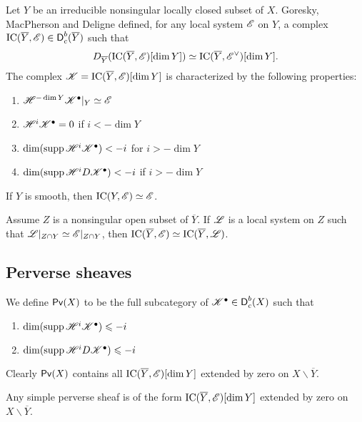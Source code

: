 \documentclass{article}
\begin{document}
Let $Y$ be an irreducible nonsingular locally closed subset of $X$. Goresky, 
MacPherson and Deligne defined, for any local system $\mathscr{E}$ on $Y$, a complex 
$\operatorname{IC}(\overline Y,\mathscr{E})\in \operatorname{\mathsf{D}}_c^b(\overline Y)$ such 
that 
\[
  D_{\overline Y}(\operatorname{IC}(\overline Y,\mathscr{E})[\dim Y]) \simeq \operatorname{IC}(\overline Y,\mathscr{E}^\vee)[\dim Y] .
\]
The complex $\mathscr{K}=\operatorname{IC}(\overline Y,\mathscr{E})[\dim Y]$ is 
characterized by the following properties:
\begin{enumerate}
  \item $\mathscr{H}^{-\dim Y} \mathscr{K}^\bullet|_Y \simeq \mathscr{E}$
  \item $\mathscr{H}^i\mathscr{K}^\bullet=0$ if $i<-\dim Y$
  \item $\dim(\operatorname{supp} \mathscr{H}^i\mathscr{K}^\bullet)<-i$ for $i>-\dim Y$
  \item $\dim(\operatorname{supp}\mathscr{H}^i D \mathscr{K}^\bullet) < -i$ if $i>-\dim Y$
\end{enumerate}

If $Y$ is smooth, then $\operatorname{IC}(Y,\mathscr{E}) \simeq \mathscr{E}$. 

\begin{exercise}
Assume $Z$ is a nonsingular open subset of $\overline Y$. If $\mathscr{L}$ is a local 
system on $Z$ such that $\mathscr{L}|_{Z\cap Y}\simeq \mathscr{E}|_{Z\cap Y}$, then 
$\operatorname{IC}(\overline Y,\mathscr{E}) \simeq \operatorname{IC}(\overline Y,\mathscr{L})$. 
\end{exercise}





\subsection{Perverse sheaves}

We define $\operatorname{\mathsf{Pv}}(X)$ to be the full subcategory of 
$\mathscr{K}^\bullet\in \operatorname{\mathsf{D}}_c^b(X)$ such that 
\begin{enumerate}
  \item $\dim(\operatorname{supp} \mathscr{H}^i\mathscr{K}^\bullet) \leqslant -i$ 
  \item $\dim(\operatorname{supp} \mathscr{H}^i D \mathscr{K}^\bullet)\leqslant -i$
\end{enumerate}
Clearly $\operatorname{\mathsf{Pv}}(X)$ contains all $\operatorname{IC}(\overline Y,\mathscr{E})[\dim Y]$ 
extended by zero on $X\smallsetminus \overline Y$. 

\begin{theorem}
Any simple perverse sheaf is of the form 
$\operatorname{IC}(\overline Y,\mathscr{E})[\dim Y]$ extended by zero on 
$X\smallsetminus \overline Y$. 
\end{theorem}
\end{document}
